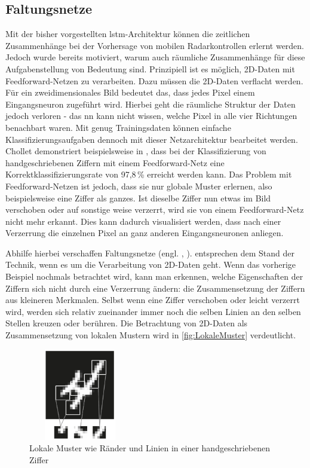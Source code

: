 \subsection{Faltungsnetze}
\label{sec:CNN}

Mit der bisher vorgestellten \acrshort{lstm}-Architektur können die zeitlichen Zusammenhänge bei der Vorhersage von mobilen Radarkontrollen erlernt werden.
Jedoch wurde bereits motiviert, warum auch räumliche Zusammenhänge für diese Aufgabenstellung von Bedeutung sind.
Prinzipiell ist es möglich, 2D-Daten mit Feedforward-Netzen zu verarbeiten.
Dazu müssen die 2D-Daten verflacht werden.
Für ein zweidimensionales Bild bedeutet das, dass jedes Pixel einem Eingangsneuron zugeführt wird.
Hierbei geht die räumliche Struktur der Daten jedoch verloren - das \acrshort{nn} kann nicht wissen, welche Pixel in alle vier Richtungen benachbart waren.
Mit genug Trainingsdaten können einfache Klassifizierungsaufgaben dennoch mit dieser Netzarchitektur bearbeitet werden.
Chollet demonstriert beispielsweise in \cite[S. 53]{DeepLearningPythonKeras}, dass bei der Klassifizierung von handgeschriebenen Ziffern mit einem Feedforward-Netz eine Korrektklassifizierungsrate von 97,8\,\% erreicht werden kann.
Das Problem mit Feedforward-Netzen ist jedoch, dass sie nur globale Muster erlernen, also beispielsweise eine Ziffer als ganzes.
Ist dieselbe Ziffer nun etwas im Bild verschoben oder auf sonstige weise verzerrt, wird sie von einem Feedforward-Netz nicht mehr erkannt.
Dies kann dadurch visualisiert werden, dass nach einer Verzerrung die einzelnen Pixel an ganz anderen Eingangsneuronen anliegen.

Abhilfe hierbei verschaffen Faltungsnetze (engl. , ).
 entsprechen dem Stand der Technik, wenn es um die Verarbeitung von 2D-Daten geht.
Wenn das vorherige Beispiel nochmals betrachtet wird, kann man erkennen, welche Eigenschaften der Ziffern sich nicht durch eine Verzerrung ändern: die Zusammensetzung der Ziffern aus kleineren Merkmalen.
Selbst wenn eine Ziffer verschoben oder leicht verzerrt wird, werden sich relativ zueinander immer noch die selben Linien an den selben Stellen kreuzen oder berühren.
Die Betrachtung von 2D-Daten als Zusammensetzung von lokalen Mustern wird in \autoref{fig:LokaleMuster} verdeutlicht.

\begin{figure}[h]
    \centering
    \includegraphics[width=0.4\textwidth,height=4cm,keepaspectratio=true]{content/images/LokaleMuster.png}
    \caption{Lokale Muster wie Ränder und Linien in einer handgeschriebenen Ziffer \cite[Abb. 5.1]{DeepLearningPythonKeras}}
    \label{fig:LokaleMuster}
\end{figure}

